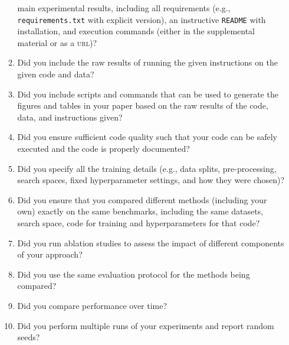 \documentclass[11pt]{article}
\begin{document}
\begin{enumerate}
\begin{enumerate}
    main experimental results, including all requirements (e.g.,
    \texttt{requirements.txt} with explicit version), an instructive
    \texttt{README} with installation, and execution commands (either in the
    supplemental material or as a \textsc{url})?
  \item Did you include the raw results of running the given instructions on the
    given code and data?
  \item Did you include scripts and commands that can be used to generate the
    figures and tables in your paper based on the raw results of the code, data,
    and instructions given?
  \item Did you ensure sufficient code quality such that your code can be safely
    executed and the code is properly documented?
  \item Did you specify all the training details (e.g., data splits,
    pre-processing, search spaces, fixed hyperparameter settings, and how they
    were chosen)?
  \item Did you ensure that you compared different methods (including your own)
    exactly on the same benchmarks, including the same datasets, search space,
    code for training and hyperparameters for that code?
  \item Did you run ablation studies to assess the impact of different
    components of your approach?
  \item Did you use the same evaluation protocol for the methods being compared?
  \item Did you compare performance over time?
  \item Did you perform multiple runs of your experiments and report random seeds?

\end{enumerate}
\end{enumerate}
\end{document}
